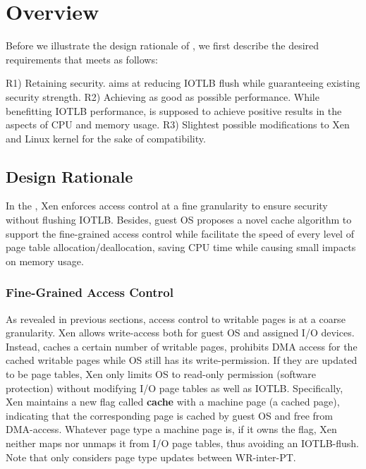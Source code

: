 \section{\name Overview} \label{sec:overview}
Before we illustrate the design rationale of \name, we first describe the desired requirements that \name meets as follows:

R1) Retaining security. \name aims at reducing IOTLB flush while guaranteeing existing security strength.
R2) Achieving as good as possible performance. While benefitting IOTLB performance, \name is supposed to achieve positive results in the aspects of CPU and memory usage.
R3) Slightest possible modifications to Xen and Linux kernel for the sake of compatibility.

\subsection{Design Rationale}
In the \name, Xen enforces access control at a fine granularity to ensure security without flushing IOTLB. Besides, guest OS proposes a novel cache algorithm to support the fine-grained access control while facilitate the speed of every level of page table allocation/deallocation, saving CPU time while causing small impacts on memory usage.

\subsubsection{Fine-Grained Access Control}
As revealed in previous sections, access control to writable pages is at a coarse granularity. Xen allows write-access both for guest OS and assigned I/O devices. Instead, \name caches a certain number of writable pages, prohibits DMA access for the cached writable pages while OS still has its write-permission. If they are updated to be page tables, Xen only limits OS to read-only permission (software protection) without modifying I/O page tables as well as IOTLB. Specifically, Xen maintains a new flag called \textbf{cache} with a machine page (a cached page), indicating that the corresponding page is cached by guest OS and free from DMA-access. Whatever page type a machine page is, if it owns the flag, Xen neither maps nor unmaps it from I/O page tables, thus avoiding an IOTLB-flush. Note that \name only considers page type updates between WR-inter-PT.

